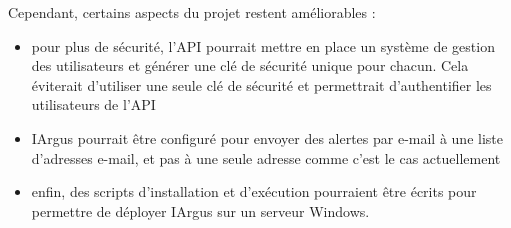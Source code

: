 \documentclass[french]{article}
\begin{document}
    Cependant, certains aspects du projet restent améliorables :
    \begin{itemize}
        \item pour plus de sécurité, l'API pourrait mettre en place un système de gestion des utilisateurs et générer une clé de sécurité unique pour chacun. Cela éviterait d'utiliser une seule clé de sécurité et permettrait d'authentifier les utilisateurs de l'API
        \item IArgus pourrait être configuré pour envoyer des alertes par e-mail à une liste d'adresses e-mail, et pas à une seule adresse comme c'est le cas actuellement
        \item enfin, des scripts d'installation et d'exécution pourraient être écrits pour permettre de déployer IArgus sur un serveur Windows.
    \end{itemize}


    
\end{document}
